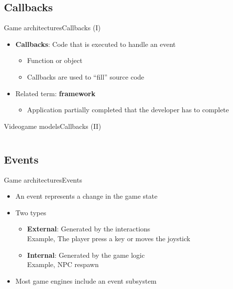 \documentclass[10pt,compress]{beamer} %
\begin{document}
\subsection{Callbacks}
\begin{frame}{Game architectures}{Callbacks (I)}
	\begin{itemize}
		\item \textbf{Callbacks}: Code that is executed to handle an event
		\begin{itemize}
			\item Function or object
			\item Callbacks are used to ``fill'' source code
		\end{itemize}
		\item Related term: \textbf{framework}
		\begin{itemize}
			\item Application partially completed that the developer has to complete
		\end{itemize}
	\end{itemize}
\end{frame}

\begin{frame}{Videogame models}{Callbacks (II)}
	\vspace{-0.3cm}
    \begin{columns}
    		\begin{block}{}
	    	\vspace{-0.2cm}
	    	
			\vspace{-0.2cm}
			\end{block}
	\end{columns}
\end{frame}

\subsection{Events}
\begin{frame}{Game architectures}{Events}
	\begin{itemize}
		\item An event represents a change in the game state
		\item Two types
		\begin{itemize}
			\item \textbf{External}: Generated by the interactions\\Example, The player press a key or moves the joystick
			\item \textbf{Internal}: Generated by the game logic\\Example, NPC respawn
		\end{itemize}
		\item Most game engines include an event subsystem

	\end{itemize}
\end{frame}
\end{document}
